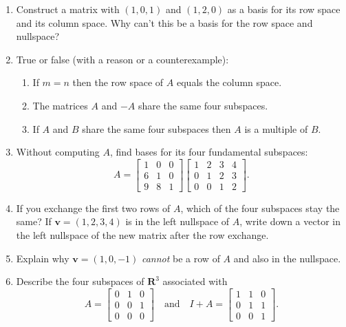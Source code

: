 \documentclass[14pt, a4paper]{article}
\begin{document}
\begin{enumerate}
    \item Construct a matrix with $(1, 0, 1)$ and $(1, 2, 0)$ as a basis for its row space and its column space. Why can't this be a basis for the row space and nullspace?

    \item True or false (with a reason or a counterexample):
          \begin{enumerate}
              \item If $m = n$ then the row space of $A$ equals the column space.
              \item The matrices $A$ and $-A$ share the same four subspaces.
              \item If $A$ and $B$ share the same four subspaces then $A$ is a multiple of $B$.
          \end{enumerate}

    \item Without computing $A$, find bases for its four fundamental subspaces:
          \[
              A = \begin{bmatrix} 1 & 0 & 0 \\ 6 & 1 & 0 \\ 9 & 8 & 1 \end{bmatrix}
              \begin{bmatrix} 1 & 2 & 3 & 4 \\ 0 & 1 & 2 & 3 \\ 0 & 0 & 1 & 2 \end{bmatrix}.
          \]

    \item If you exchange the first two rows of $A$, which of the four subspaces stay the same? If $\boldsymbol{v} = (1, 2, 3, 4)$ is in the left nullspace of $A$, write down a vector in the left nullspace of the new matrix after the row exchange.

    \item Explain why $\boldsymbol{v} = (1, 0, -1)$ \emph{cannot} be a row of $A$ and also in the nullspace.

    \item Describe the four subspaces of $\mathbf{R}^3$ associated with
          \[
              A = \begin{bmatrix} 0 & 1 & 0 \\ 0 & 0 & 1 \\ 0 & 0 & 0 \end{bmatrix} \quad \text{and} \quad
              I + A = \begin{bmatrix} 1 & 1 & 0 \\ 0 & 1 & 1 \\ 0 & 0 & 1 \end{bmatrix}.
          \]


\end{enumerate}
\end{document}
